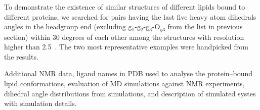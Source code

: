 \documentclass[journal=jpcbfk,manuscript=article]{achemso}
\begin{document}
To demonstrate the existence of similar structures of different lipids bound to different proteins, we searched for pairs having the last five heavy atom dihedrals angles in the headgroup end (excluding g$_1$-g$_2$-g$_3$-O$_{g3}$ from the list in previous section) within
30 degrees of each other among the structures with resolution higher than 2.5~\text{\AA}. The two most representative examples
were handpicked from the results.

\begin{suppinfo}

Additional NMR data, ligand names in PDB used to analyse the protein--bound lipid conformations, evaluation of MD simulations against NMR experiments, dihedral angle distributions from simulations, and description of simulated systes with simulation details. 


\end{suppinfo}
\end{document}
